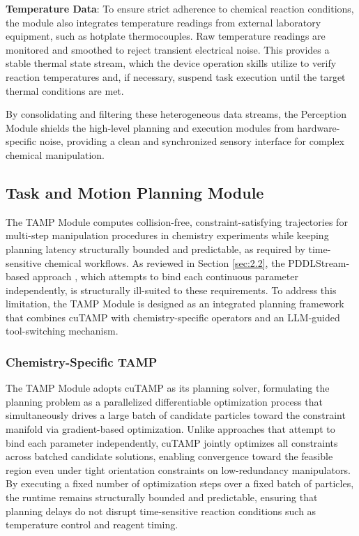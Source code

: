\documentclass{ieeeaccess}
\begin{document}
\textbf{Temperature Data}: To ensure strict adherence to chemical reaction conditions, the module also integrates temperature readings from external laboratory equipment, such as hotplate thermocouples. Raw temperature readings are monitored and smoothed to reject transient electrical noise. This provides a stable thermal state stream, which the device operation skills utilize to verify reaction temperatures and, if necessary, suspend task execution until the target thermal conditions are met.

By consolidating and filtering these heterogeneous data streams, the Perception Module shields the high-level planning and execution modules from hardware-specific noise, providing a clean and synchronized sensory interface for complex chemical manipulation.

\subsection{Task and Motion Planning Module}\label{sec:3.4}
The TAMP Module computes collision-free, constraint-satisfying trajectories for multi-step manipulation procedures in chemistry experiments while keeping planning latency structurally bounded and predictable, as required by time-sensitive chemical workflows. As reviewed in Section \ref{sec:2.2}, the PDDLStream-based approach \cite{bib5}, which attempts to bind each continuous parameter independently, is structurally ill-suited to these requirements. To address this limitation, the TAMP Module is designed as an integrated planning framework that combines cuTAMP \cite{shen2025differentiable} with chemistry-specific operators and an LLM-guided tool-switching mechanism.

\subsubsection{Chemistry-Specific TAMP}\label{sec:3.4.1}
The TAMP Module adopts cuTAMP as its planning solver, formulating the planning problem as a parallelized differentiable optimization process that simultaneously drives a large batch of candidate particles toward the constraint manifold via gradient-based optimization. Unlike approaches that attempt to bind each parameter independently, cuTAMP jointly optimizes all constraints across batched candidate solutions, enabling convergence toward the feasible region even under tight orientation constraints on low-redundancy manipulators. By executing a fixed number of optimization steps over a fixed batch of particles, the runtime remains structurally bounded and predictable, ensuring that planning delays do not disrupt time-sensitive reaction conditions such as temperature control and reagent timing.
\end{document}
